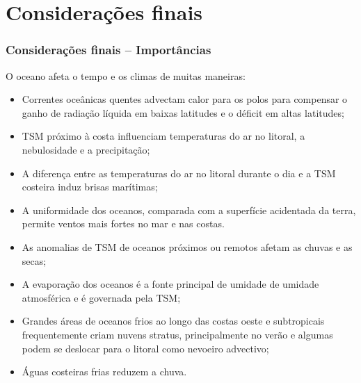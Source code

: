 \section{Considerações finais}
\begin{frame}
  \frametitle{Considerações finais -- Importâncias}
  \scriptsize{O oceano afeta o tempo e os climas de muitas maneiras:
  \begin{itemize}[<+-| alert@+>]
    \item Correntes oceânicas quentes advectam calor para os polos para
          compensar o ganho de radiação líquida em baixas latitudes e o déficit
          em altas latitudes;
    \item TSM próximo à costa influenciam temperaturas do ar no litoral, a
          nebulosidade e a precipitação;
    \item A diferença entre as temperaturas do ar no litoral durante o dia e a
          TSM costeira induz brisas marítimas;
    \item A uniformidade dos oceanos, comparada com a superfície acidentada da
          terra, permite ventos mais fortes no mar e nas costas.
    \item As anomalias de TSM de oceanos próximos ou remotos afetam as chuvas e
          as secas;
    \item  A evaporação dos oceanos é a fonte principal de umidade de umidade
           atmosférica e é governada pela TSM;
    \item  Grandes áreas de oceanos frios ao longo das costas oeste e subtropicais frequentemente criam nuvens stratus, principalmente no verão e algumas podem se
deslocar para o litoral como nevoeiro advectivo;
    \item  Águas costeiras frias reduzem a chuva.
    \end{itemize}
    }
\end{frame}



